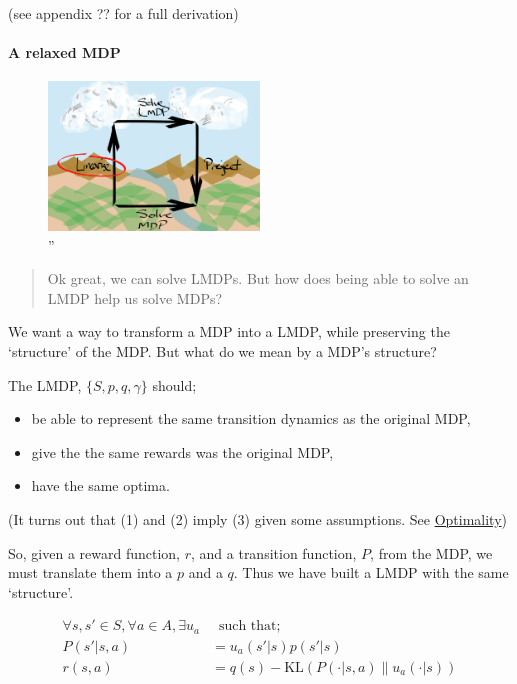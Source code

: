 (see appendix ?? for a full derivation)

\hypertarget{a-relaxed-mdp}{%
\paragraph{A relaxed MDP}\label{a-relaxed-mdp}}

\begin{figure}
\centering
\includegraphics[width=0.5\textwidth,height=0.5\textheight]{../../pictures/drawings/abstract-representations-linear.png}
\caption{''}
\end{figure}

\begin{quote}
Ok great, we can solve LMDPs. But how does being able to solve an LMDP
help us solve MDPs?
\end{quote}

We want a way to transform a MDP into a LMDP, while preserving the
`structure' of the MDP. But what do we mean by a MDP's structure?

The LMDP, \(\{S, p, q, \gamma\}\) should;

\begin{itemize}
\tightlist
\item
  be able to represent the same transition dynamics as the original MDP,
\item
  give the the same rewards was the original MDP,
\item
  have the same optima.
\end{itemize}

(It turns out that (1) and (2) imply (3) given some assumptions. See
\href{}{Optimality})

So, given a reward function, \(r\), and a transition function, \(P\),
from the MDP, we must translate them into a \(p\) and a \(q\). Thus we
have built a LMDP with the same `structure'.

\begin{align}
\forall s, s' \in S, \forall a \in A, \exists u_a& \;\;\text{such that;} \\
P(s' | s, a) &= u_a(s'|s)p(s'|s) \tag{1}\\
r(s, a) &= q(s) - \text{KL}(P(\cdot | s, a) \parallel u_a(\cdot| s) ) \tag{2}\\
\end{align}

